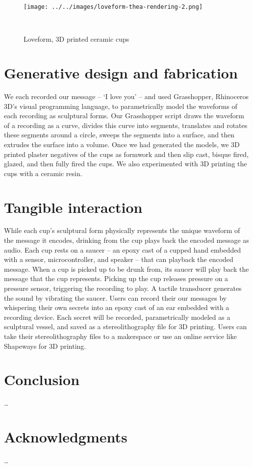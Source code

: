 \documentclass{sigchi}
\begin{document}
\begin{figure*}
  \centering
  \texttt{[image: ../../images/loveform-thea-rendering-2.png]}
  \caption{Loveform, 3D printed ceramic cups}~\label{fig:loveform_1}
\end{figure*}

\section{Generative design and fabrication}
We each recorded our message -- `I love you' -- and used Grasshopper,  Rhinoceros 3D's visual programming language, to parametrically model the waveforms of each recording as sculptural forms. Our Grasshopper script draws the waveform of a recording as a curve, divides this curve into segments, translates and rotates these segments around a circle, sweeps the segments into a surface, and then extrudes the surface into a volume. Once we had generated the models,  we 3D printed plaster negatives of the cups as formwork and then slip cast, bisque fired, glazed, and then fully fired the cups. We also experimented with 3D printing the cups with a ceramic resin. 

\section{Tangible interaction}
While each cup's sculptural form physically represents the unique waveform of the message it encodes, drinking from the cup plays back the encoded message as audio. Each cup rests on a saucer – an epoxy cast of a cupped hand embedded with a sensor, microcontroller, and speaker – that can playback the encoded message. When a cup is picked up to be drunk from, its saucer will play back the message that the cup represents. Picking up the cup releases pressure on a pressure sensor, triggering the recording to play. A tactile transducer generates the sound by vibrating the saucer. Users can record their our messages by whispering their own secrets into an epoxy cast of an ear embedded with a recording device. Each secret will be recorded, parametrically modeled as a sculptural vessel, and saved as a stereolithography file for 3D printing. Users can take their stereolithography files to a makerspace or use an online service like Shapeways for 3D printing.  








\section{Conclusion}

\ldots

\section{Acknowledgments}
\ldots

\balance{}

\balance{}



\end{document}
